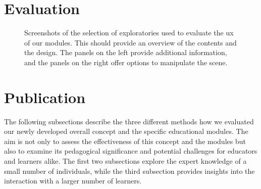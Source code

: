 \section{Evaluation}

\begin{figure}[t!bh]
	\centering
	\captionsetup{labelfont=bf,textfont=it}
	\caption[Screenshots of user evaluated exploratories.]{Screenshots of the selection of exploratories used to evaluate the \acrshort{ux} of our modules. This should provide an overview of the contents and the design. The panels on the left provide additional information, and the panels on the right offer options to manipulate the scene.}
	\label{fig:uxEval}
\end{figure}
\section{Publication\label{sec:publication}}

The following subsections describe the three different methods how we evaluated our newly developed overall concept and the specific educational modules. The aim is not only to assess the effectiveness of this concept and the modules but also to examine its pedagogical significance and potential challenges for educators and learners alike. The first two subsections explore the expert knowledge of a small number of individuals, while the third subsection provides insights into the interaction with a larger number of learners.


